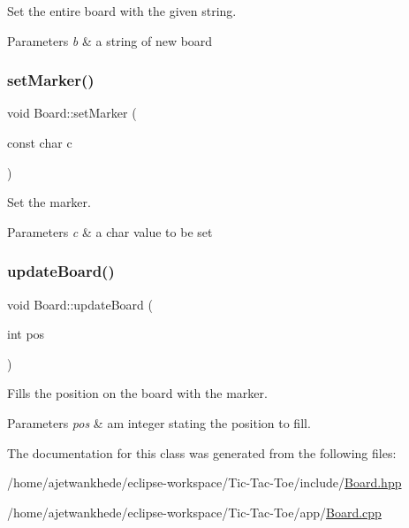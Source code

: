 Set the entire board with the given string. 


\begin{DoxyParams}{Parameters}
{\em b} & a string of new board \\
\hline
\end{DoxyParams}
\mbox{\label{classBoard_add8b23c5ba550963a8e1641b6df26fa9}} 
\subsubsection{\texorpdfstring{set\+Marker()}{setMarker()}}
{\footnotesize\ttfamily void Board\+::set\+Marker (\begin{DoxyParamCaption}\item[{const char}]{c }\end{DoxyParamCaption})}



Set the marker. 


\begin{DoxyParams}{Parameters}
{\em c} & a char value to be set \\
\hline
\end{DoxyParams}
\mbox{\label{classBoard_a44d5f45daeec9a19d48d17aa02601a17}} 
\subsubsection{\texorpdfstring{update\+Board()}{updateBoard()}}
{\footnotesize\ttfamily void Board\+::update\+Board (\begin{DoxyParamCaption}\item[{int}]{pos }\end{DoxyParamCaption})\hspace{0.3cm}{\ttfamily [virtual]}}



Fills the position on the board with the marker. 


\begin{DoxyParams}{Parameters}
{\em pos} & am integer stating the position to fill. \\
\hline
\end{DoxyParams}


The documentation for this class was generated from the following files\+:\begin{DoxyCompactItemize}
\item 
/home/ajetwankhede/eclipse-\/workspace/\+Tic-\/\+Tac-\/\+Toe/include/\mbox{\hyperlink{Board_8hpp}{Board.\+hpp}}\item 
/home/ajetwankhede/eclipse-\/workspace/\+Tic-\/\+Tac-\/\+Toe/app/\mbox{\hyperlink{Board_8cpp}{Board.\+cpp}}\end{DoxyCompactItemize}
